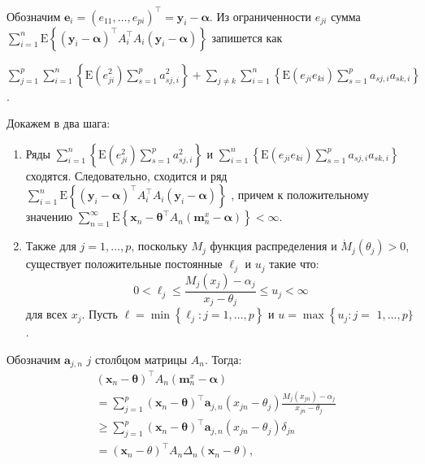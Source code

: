 Обозначим $\mathbf{e}_{i}=\left(e_{11}, \ldots,e_{p i}\right)^{\top}=\mathbf{y}_{i}-\boldsymbol{\alpha}$. 
Из ограниченности $e_{j i}$ сумма $\sum_{i=1}^{n} \mathrm{E}\left\{\left(\mathbf{y}_{i}-\boldsymbol{\alpha}\right)^{\top} A_{i}^{\top} A_{i}\left(\mathbf{y}_{i}-\boldsymbol{\alpha}\right)\right\}$ запишется как 

$\sum_{j=1}^{p} \sum_{i=1}^{n}\left\{\mathrm{E}\left(e_{j i}^{2}\right) \sum_{s=1}^{p} a_{s j, i}^{2}\right\}+\sum_{j \neq k} \sum_{i=1}^{n}\left\{\mathrm{E}\left(e_{j i} e_{k i}\right) \sum_{s=1}^{p} a_{s j, i} a_{s k, i}\right\}$.

Докажем в два шага:
 \begin{enumerate}
    \item Ряды $\sum_{i=1}^{n}\left\{\mathrm{E}\left(e_{j i}^{2}\right) \sum_{s=1}^{p} a_{s j, i}^{2}\right\}$ 
    и $\sum_{i=1}^{n}\left\{\mathrm{E}\left(e_{j i} e_{k i}\right) \sum_{s=1}^{p} a_{s j, i} a_{s k, i}\right\}$ 
    сходятся. Следовательно, сходится и ряд 
    $\sum_{i=1}^{n} \mathrm{E}\left\{\left(\mathbf{y}_{i}-\boldsymbol{\alpha}\right)^{\top} A_{i}^{\top} A_{i}\left(\mathbf{y}_{i}-\boldsymbol{\alpha}\right)\right\}$
    , причем к положительному значению $\sum_{n=1}^{\infty} \mathrm{E}\left\{\mathbf{x}_{n}-\boldsymbol{\theta}^{\top} A_{n}\left(\mathbf{m}_{n}^{x}-\boldsymbol{\alpha}\right)\right\}<\infty$.
    \item Также для $j=1, \ldots, p$, поскольку $M_{j}$ функция распределения и 
    $\dot{M}_{j}\left(\theta_{j}\right)>0$, существует положительные постоянные $\ell_{j}$ и $u_{j}$ такие что:
    $$
        0<\ell_{j} \leq \frac{M_{j}\left(x_{j}\right)-\alpha_{j}}{x_{j}-\theta_{j}} \leq u_{j}<\infty
    $$
    для всех $x_{j}$. Пусть $\ell=\min \left\{\ell_{j}: j=1, \ldots, p\right\}$ и $u=\max \left\{u_{j}: j=\right.$ $1, \ldots, p\}$. 
\end{enumerate}
Обозначим $\mathbf{a}_{j, n}$ $j$ столбцом матрицы $A_{n}$. Тогда:
\begin{equation}
    \begin{aligned}
        & \left(\mathbf{x}_{n}-\boldsymbol{\theta}\right)^{\top} A_{n}\left(\mathbf{m}_{n}^{x}-\boldsymbol{\alpha}\right) \\
        & =\sum_{j=1}^{p}\left(\mathbf{x}_{n}-\boldsymbol{\theta}\right)^{\top} \mathbf{a}_{j, n}\left(x_{j n}-\theta_{j}\right) \frac{M_{j}\left(x_{j n}\right)-\alpha_{j}}{x_{j n}-\theta_{j}} \\
        & \geq \sum_{j=1}^{p}\left(\mathbf{x}_{n}-\boldsymbol{\theta}\right)^{\top} \mathbf{a}_{j, n}\left(x_{j n}-\theta_{j}\right) \delta_{j n} \\
        & =\left(\mathbf{x}_{n}-\theta\right)^{\top} A_{n} \Delta_{n}\left(\mathbf{x}_{n}-\theta\right),
    \end{aligned}
\end{equation}
